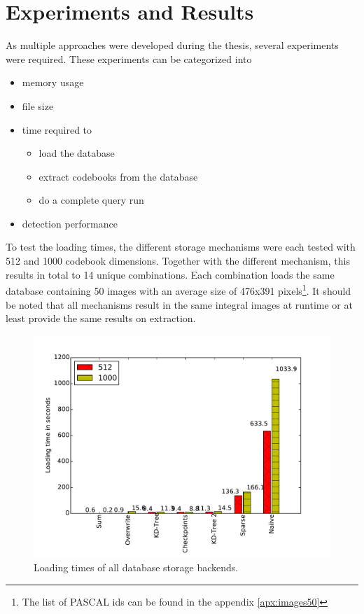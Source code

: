 \chapter{Experiments and Results}
\label{cha:experiments}

As multiple approaches were developed during the thesis, several experiments were required. These experiments can be categorized into 

\begin{itemize}
\item memory usage
\item file size
\item time required to
    \begin{itemize}
    \item load the database
    \item extract codebooks from the database
    \item do a complete query run
    \end{itemize}
\item detection performance
\end{itemize}

To test the loading times, the different storage mechanisms were each tested with 512 and 1000 codebook dimensions. Together with the different mechanism, this results in total to 14 unique combinations. Each combination loads the same database containing 50 images with an average size of 476x391 pixels\footnote{The list of PASCAL ids can be found in the appendix \ref{apx:images50}}. It should be noted that all mechanisms result in the same integral images at runtime or at least provide the same results on extraction.

\begin{figure}
\centering
\includegraphics[width=0.7\linewidth]{images/loading_time}
\caption{Loading times of all database storage backends.}
\label{fig:loading_all}
\end{figure}


